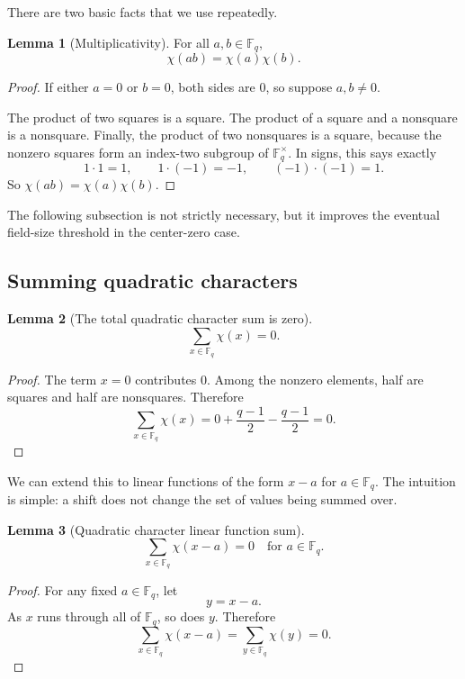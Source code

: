 \documentclass{article}
\newcommand{\F}{\mathbb F}
\theoremstyle{definition}
\newtheorem{lemma}{Lemma}
\numberwithin{equation}{section}
\begin{document}
There are two basic facts that we use repeatedly.

\begin{lemma}[Multiplicativity]
For all \(a,b\in\F_q\),
\[
\chi(ab)=\chi(a)\chi(b).
\]
\end{lemma}

\begin{proof}
If either \(a=0\) or \(b=0\), both sides are \(0\), so suppose \(a,b\neq0\).

The product of two squares is a square. The product of a square and a nonsquare is a nonsquare. Finally, the product of two nonsquares is a square, because the nonzero squares form an index-two subgroup of \(\F_q^\times\). In signs, this says exactly
\[
1\cdot1=1,
\qquad
1\cdot(-1)=-1,
\qquad
(-1)\cdot(-1)=1.
\]
So \(\chi(ab)=\chi(a)\chi(b)\).
\end{proof}

The following subsection is not strictly necessary, but it improves the eventual field-size threshold in the center-zero case.

\subsection{Summing quadratic characters}

\begin{lemma}[The total quadratic character sum is zero]
\[
\sum_{x\in\F_q}\chi(x)=0.
\]
\end{lemma}

\begin{proof}
The term \(x=0\) contributes \(0\). Among the nonzero elements, half are squares and half are nonsquares. Therefore
\[
\sum_{x\in\F_q}\chi(x)
=
0+\frac{q-1}{2}-\frac{q-1}{2}=0.
\]
\end{proof}

We can extend this to linear functions of the form \(x-a\) for \(a\in\F_q\). The intuition is simple: a shift does not change the set of values being summed over.
\begin{lemma}[Quadratic character linear function sum]
\[
\boxed{
\sum_{x\in\F_q}\chi(x-a)=0 \quad \text{for }a \in \F_q.}
\]
\label{linear_sum}
\end{lemma}

\begin{proof}
For any fixed \(a\in\F_q\), let
\[
y=x-a.
\]
As \(x\) runs through all of \(\F_q\), so does \(y\). Therefore
\[
\sum_{x\in\F_q}\chi(x-a)
=
\sum_{y\in\F_q}\chi(y)
=0.
\]
\end{proof}
\end{document}
